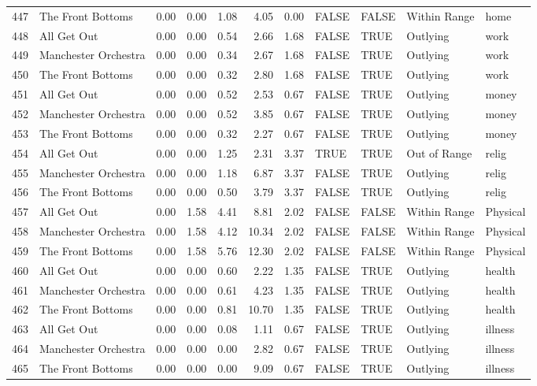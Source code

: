 \begin{table}[ht]
\begin{tabular}{rlrrrrrllll}
  447 & The Front Bottoms & 0.00 & 0.00 & 1.08 & 4.05 & 0.00 & FALSE & FALSE & Within Range & home \\ 
  448 & All Get Out & 0.00 & 0.00 & 0.54 & 2.66 & 1.68 & FALSE & TRUE & Outlying & work \\ 
  449 & Manchester Orchestra & 0.00 & 0.00 & 0.34 & 2.67 & 1.68 & FALSE & TRUE & Outlying & work \\ 
  450 & The Front Bottoms & 0.00 & 0.00 & 0.32 & 2.80 & 1.68 & FALSE & TRUE & Outlying & work \\ 
  451 & All Get Out & 0.00 & 0.00 & 0.52 & 2.53 & 0.67 & FALSE & TRUE & Outlying & money \\ 
  452 & Manchester Orchestra & 0.00 & 0.00 & 0.52 & 3.85 & 0.67 & FALSE & TRUE & Outlying & money \\ 
  453 & The Front Bottoms & 0.00 & 0.00 & 0.32 & 2.27 & 0.67 & FALSE & TRUE & Outlying & money \\ 
  454 & All Get Out & 0.00 & 0.00 & 1.25 & 2.31 & 3.37 & TRUE & TRUE & Out of Range & relig \\ 
  455 & Manchester Orchestra & 0.00 & 0.00 & 1.18 & 6.87 & 3.37 & FALSE & TRUE & Outlying & relig \\ 
  456 & The Front Bottoms & 0.00 & 0.00 & 0.50 & 3.79 & 3.37 & FALSE & TRUE & Outlying & relig \\ 
  457 & All Get Out & 0.00 & 1.58 & 4.41 & 8.81 & 2.02 & FALSE & FALSE & Within Range & Physical \\ 
  458 & Manchester Orchestra & 0.00 & 1.58 & 4.12 & 10.34 & 2.02 & FALSE & FALSE & Within Range & Physical \\ 
  459 & The Front Bottoms & 0.00 & 1.58 & 5.76 & 12.30 & 2.02 & FALSE & FALSE & Within Range & Physical \\ 
  460 & All Get Out & 0.00 & 0.00 & 0.60 & 2.22 & 1.35 & FALSE & TRUE & Outlying & health \\ 
  461 & Manchester Orchestra & 0.00 & 0.00 & 0.61 & 4.23 & 1.35 & FALSE & TRUE & Outlying & health \\ 
  462 & The Front Bottoms & 0.00 & 0.00 & 0.81 & 10.70 & 1.35 & FALSE & TRUE & Outlying & health \\ 
  463 & All Get Out & 0.00 & 0.00 & 0.08 & 1.11 & 0.67 & FALSE & TRUE & Outlying & illness \\ 
  464 & Manchester Orchestra & 0.00 & 0.00 & 0.00 & 2.82 & 0.67 & FALSE & TRUE & Outlying & illness \\ 
  465 & The Front Bottoms & 0.00 & 0.00 & 0.00 & 9.09 & 0.67 & FALSE & TRUE & Outlying & illness \\ 

\end{tabular}
\end{table}
